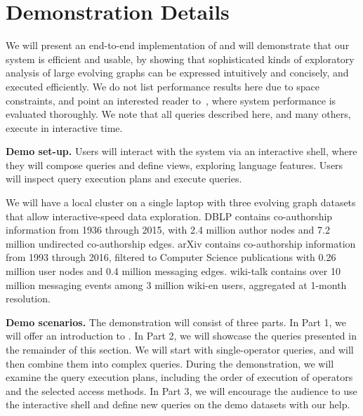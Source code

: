 \section{Demonstration Details}
\label{sec:cases}

We will present an end-to-end implementation of \sys and will
demonstrate that our system is efficient and usable, by showing that
sophisticated kinds of exploratory analysis of large evolving graphs
can be expressed intuitively and concisely, and executed efficiently.
We do not list performance results here due to space constraints, and
point an interested reader to~\cite{PortalarXiv2016}, where system
performance is evaluated thoroughly.  We note that all queries
described here, and many others, execute in interactive time.

{\bf Demo set-up.} Users will interact with the \sys system via an
interactive shell, where they will compose queries and define \tg
views, exploring language features.  Users will inspect query
execution plans and execute queries.

We will have a local cluster on a single laptop with three evolving
graph datasets that allow interactive-speed data exploration. DBLP
contains co-authorship information from 1936 through 2015, with 2.4
million author nodes and 7.2 million undirected co-authorship edges.
arXiv contains co-authorship information from 1993 through 2016,
filtered to Computer Science publications with 0.26 million user nodes
and 0.4 million messaging edges.  wiki-talk contains over 10 million
messaging events among 3 million wiki-en users,
aggregated at 1-month resolution.

{\bf Demo scenarios.} The demonstration will consist of three parts.
In Part 1, we will offer an introduction to \ql.  In Part 2, we will
showcase the queries presented in the remainder of this section. We will start with single-operator
queries, and will then combine them into complex queries.  During the
demonstration, we will examine the query execution plans, including
the order of execution of \tga operators and the selected access
methods.  In Part 3, we will encourage the audience to use the
interactive shell and define new queries on the demo datasets with our
help.

